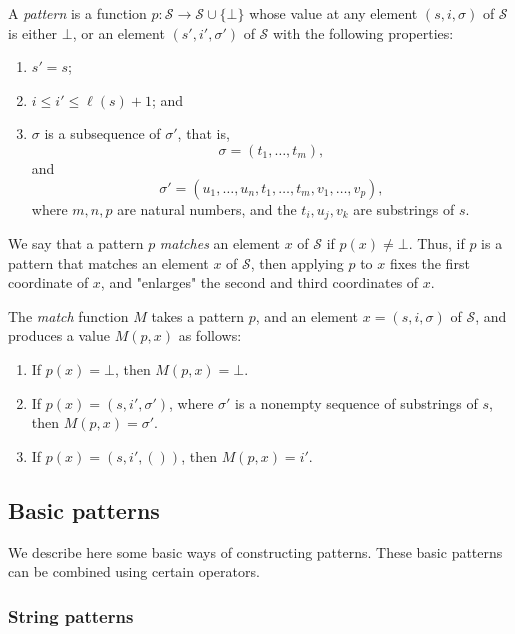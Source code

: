 \documentclass{article}
\begin{document}
A \emph{pattern} is a function
\(p : \mathcal{S} \to \mathcal{S} \cup \{\bot\}\) whose value at any
element \((s, i, \sigma)\) of \(\mathcal{S}\) is either \(\bot\), or
an element \((s', i', \sigma')\) of \(\mathcal{S}\) with the following
properties:
\begin{enumerate}
\item \(s' = s\);
\item \(i \leq i' \leq \ell(s) + 1\); and
\item \(\sigma\) is a subsequence of \(\sigma'\), that is,
  \begin{displaymath}
    \sigma = (t_1, \dotsc, t_m),
  \end{displaymath}
  and
  \begin{displaymath}
    \sigma' =
    (u_1, \dotsc, u_n, t_1, \dotsc, t_m, v_1, \dotsc, v_p),
  \end{displaymath}
  where \(m, n, p\) are natural numbers, and the \(t_i, u_j, v_k\) are
  substrings of \(s\).
\end{enumerate}

We say that a pattern \(p\) \emph{matches} an element \(x\) of
\(\mathcal{S}\) if \(p(x) \neq \bot\).  Thus, if \(p\) is a pattern
that matches an element \(x\) of \(\mathcal{S}\), then applying \(p\)
to \(x\) fixes the first coordinate of \(x\), and "enlarges" the
second and third coordinates of \(x\).

The \emph{match} function \(M\) takes a pattern \(p\), and an
element \(x = (s, i, \sigma)\) of \(\mathcal{S}\), and produces a
value \(M(p, x)\) as follows:
\begin{enumerate}
\item If \(p(x) = \bot\), then \(M(p, x) = \bot\).
\item If \(p(x) = (s, i', \sigma')\), where \(\sigma'\) is a nonempty
  sequence of substrings of \(s\), then \(M(p, x) = \sigma'\).
\item If \(p(x) = (s, i', ())\), then \(M(p, x) = i'\).
\end{enumerate}

\subsection{Basic patterns}
\label{sec:2ynr2sf4}

We describe here some basic ways of constructing patterns.  These
basic patterns can be combined using certain operators.

\subsubsection{String patterns}
\label{sec:zn6czomy}
\end{document}
